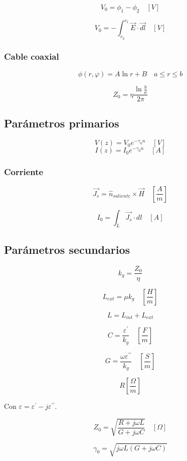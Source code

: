 \documentclass[12pt,a4paper]{article}
\begin{document}
\[ V_0 = \phi_1 - \phi_2 \quad [V] \]

\[V_0 = - \int_{c_{2}}^{c_{1}} \vec{E} \cdot \vec{dl} \quad [V] \]

\subsubsection{Cable coaxial}
\label{ssub:cable_coaxial}

\[ \phi (r,\varphi) = A \ln{r} +B \quad a \leq r \leq b \]

\[ Z_0 = \eta \frac{\ln{\frac{b}{a}}}{2\pi} \]

\subsection{Parámetros primarios}
\label{sub:parametros_primarios}

\[ V(z) = V_0 e^{- \gamma_0 n} \quad [V] \]
\[ I(z) = I_0 e^{- \gamma_0 n} \quad [A] \]

\subsubsection{Corriente}
\label{ssub:corriente}

\[ \vec{J_s} = \hat{n}_{saliente} \times \vec{H} \quad \left[\frac{A}{m}\right] \]

\[ I_0 = \int_L \vec{J_s} \cdot dl \quad [A] \]

\subsection{Parámetros secundarios}
\label{sub:parametros_secundarios}

\[ k_g = \frac{Z_0}{\eta} \]

\[ L_{ext} = \mu k_g \quad \left[ \frac{H}{m} \right] \]

\[ L = L_{int} + L_{ext} \]

\[ C = \frac{\varepsilon^{\prime}}{k_g} \quad \left[ \frac{F}{m} \right] \]

\[ G = \frac{\omega \varepsilon^{\prime\prime}}{k_g} \quad \left[ \frac{S}{m} \right] \]

\[ R \left[ \frac{\Omega}{m} \right] \]

Con $ \varepsilon = \varepsilon^{\prime} -j\varepsilon^{\prime\prime} $.

\[ Z_0 = \sqrt{\frac{R + j \omega L}{G + j \omega C}} \quad [\Omega] \]

\[ \gamma_0 =  \sqrt{j \omega L (G + j \omega C )} \]
\end{document}
